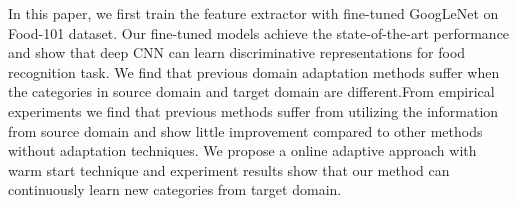 In this paper, we first train the feature extractor with fine-tuned GoogLeNet on Food-101 dataset. Our fine-tuned models achieve the state-of-the-art performance and show that deep CNN can learn discriminative representations for food recognition task. We find that previous domain adaptation methods suffer when the categories in source domain and target domain are different.From empirical experiments we find that previous methods suffer from utilizing the information from source domain and show little improvement compared to other methods without adaptation techniques. We propose a online adaptive approach with warm start technique and experiment results show that our method can continuously learn new categories from target domain.

